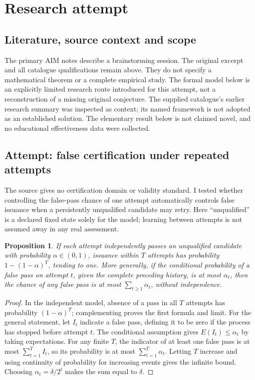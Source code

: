 \documentclass[11pt]{article}
\newtheorem{proposition}{Proposition}
\begin{document}
\section{Research attempt}
\subsection{Literature, source context and scope}
The primary AIM notes describe a brainstorming session. The original excerpt and all catalogue qualifications remain above. They do not specify a mathematical theorem or a complete empirical study. The formal model below is an explicitly limited research route introduced for this attempt, not a reconstruction of a missing original conjecture. The supplied catalogue's earlier research summary was inspected as context; its named framework is not adopted as an established solution. The elementary result below is not claimed novel, and no educational effectiveness data were collected.

\subsection{Attempt: false certification under repeated attempts}
The source gives no certification domain or validity standard. I tested whether controlling the false-pass chance of one attempt automatically controls false issuance when a persistently unqualified candidate may retry. Here ``unqualified'' is a declared fixed state solely for the model; learning between attempts is not assumed away in any real assessment.
\begin{proposition}
If each attempt independently passes an unqualified candidate with probability $\alpha\in(0,1)$, issuance within $T$ attempts has probability $1-(1-\alpha)^T$, tending to one. More generally, if the conditional probability of a false pass on attempt $t$, given the complete preceding history, is at most $\alpha_t$, then the chance of any false pass is at most $\sum_{t\ge1}\alpha_t$, without independence.
\end{proposition}
\begin{proof}
In the independent model, absence of a pass in all $T$ attempts has probability $(1-\alpha)^T$; complementing proves the first formula and limit. For the general statement, let $I_t$ indicate a false pass, defining it to be zero if the process has stopped before attempt $t$. The conditional assumption gives $E(I_t)\le\alpha_t$ by taking expectations. For any finite $T$, the indicator of at least one false pass is at most $\sum_{t=1}^TI_t$, so its probability is at most $\sum_{t=1}^T\alpha_t$. Letting $T$ increase and using continuity of probability for increasing events gives the infinite bound. Choosing $\alpha_t=\delta/2^t$ makes the sum equal to $\delta$.
\end{proof}
\end{document}
